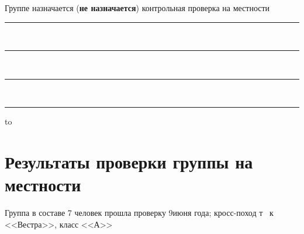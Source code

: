 \documentclass[a5paper, 12pt, twoside]{article}
\begin{document}
        Группе назначается (\textbf{не назначается}) контрольная проверка на местности\;\leaders\hrule height 0.2pt\hfill\strut
        \vspace{0.2cm}
        
        \,\leaders\hrule height 0.2pt\hfill\strut
        \vspace{0.2cm}
        
        \,\leaders\hrule height 0.2pt\hfill\strut
        \vspace{0.2cm}
        
        \,\leaders\hrule height 0.2pt\hfill\strut
        
        \hbox to 

\newpage %

    \section[]{Результаты проверки группы на\\ местности}

        Группа в составе 7 человек прошла проверку 9\;июня года; кросс-поход т \ к <<Вестра>>, класс <<А>>
        \vspace{0.2cm}

        

        
        
        
        
\end{document}
